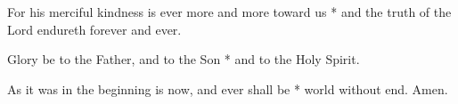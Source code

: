 \begin{multicols}{2}
	For his merciful kindness is ever more and more toward us * and the truth of the Lord endureth forever and ever.
	
	Glory be to the Father, and to the Son * and to the Holy Spirit.
	
	As it was in the beginning is now, and ever shall be * world without end. Amen.
\end{multicols}